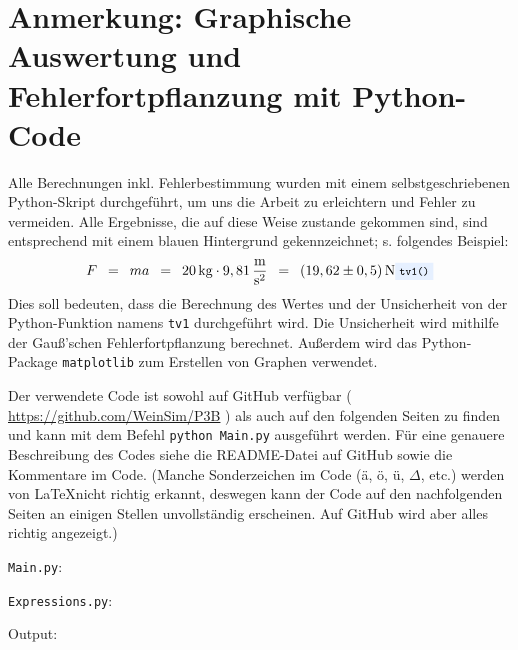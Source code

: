 \documentclass{article}
\newcommand{\widespace}{\enspace}
\newcommand{\wideeq}{\widespace = \widespace}
\newcommand{\result}[2]{
    #1 \, \text{#2}
}
\newcommand{\coderef}[1]{%
    \text{\footnotesize \colorbox{codebg}{\texttt{#1()}}}%
}
\newcommand{\githuburl}{
    \url{https://github.com/WeinSim/P3B}
}
\begin{document}
    \newpage

\newpage

\section{Anmerkung: Graphische Auswertung und Fehlerfortpflanzung mit Python-Code}

Alle Berechnungen inkl. Fehlerbestimmung wurden mit einem selbstgeschriebenen
Python-Skript durchgeführt, um uns die Arbeit zu erleichtern und Fehler zu
vermeiden. Alle Ergebnisse, die auf diese Weise zustande gekommen sind,
sind entsprechend mit einem \colorbox{codebg}{blauen Hintergrund} gekennzeichnet;
s. folgendes Beispiel:
\[
    F \wideeq ma \wideeq \result{20}{kg} \cdot 9,81 \, \frac{\text m}{\text s^2}
    \wideeq \result{(19,62 \pm 0,5)}{N} \coderef{tv1}
\]
Dies soll bedeuten, dass die Berechnung des Wertes und der Unsicherheit von der
Python-Funktion namens \verb|tv1| durchgeführt wird.
Die Unsicherheit wird mithilfe der Gauß'schen Fehlerfortpflanzung berechnet.
Außerdem wird das Python-Package \texttt{matplotlib} zum Erstellen
von Graphen verwendet.

Der verwendete Code ist sowohl auf GitHub verfügbar (\githuburl) als auch auf den
folgenden Seiten zu finden und kann mit dem Befehl \texttt{python Main.py}
ausgeführt werden. Für eine genauere Beschreibung des Codes siehe die README-Datei
auf GitHub sowie die Kommentare im Code.
(Manche Sonderzeichen im Code (ä, ö, ü, $\Delta$, etc.) werden von \LaTeX nicht
richtig erkannt, deswegen kann der Code auf den nachfolgenden Seiten an einigen
Stellen unvollständig erscheinen. Auf GitHub wird aber alles richtig angezeigt.)

\newpage


\verb|Main.py|:

\newpage

\verb|Expressions.py|:

\newpage

Output:


\fi
\end{document}
